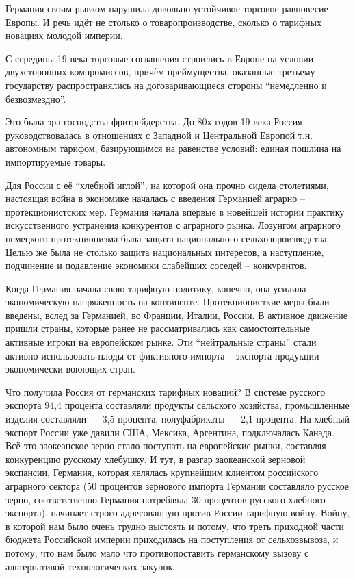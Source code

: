 Германия своим рывком нарушила довольно устойчивое торговое равновесие Европы.
И речь идёт не столько о товаропроизводстве, сколько о тарифных новациях молодой
империи.

С середины 19 века торговые соглашения строились в Европе на условии
двухсторонних компромиссов, причём прей\-мущества, оказанные третьему
государству распространялись на договаривающиеся стороны \enquote{немедленно и
безвозмездно}.

Это была эра господства фритрейдерства. До 80х годов 19 века Россия
руководствовалась в отношениях с Западной и Центральной Европой т.н. автономным
тарифом, базирующимся на равенстве условий: единая пошлина на импортируемые
товары.

Для России с её \enquote{хлебной иглой}, на которой она прочно сидела столетиями,
настоящая война в экономике началась с введения Германией
аграрно -- протекционистских мер. Германия начала впервые в новейшей истории
практику искусственного устранения конкурентов с аграрного рынка. Лозунгом
аграрного немецкого протекционизма была защита национального
сельхозпроизводства. Целью же была не столько защита национальных интересов,
а наступление, подчинение и подавление экономики слабейших соседей -- конкурентов.

Когда Германия начала свою тарифную политику, конечно, она усилила
экономическую напряженность на континенте. Протекционисткие меры были введены,
вслед за Германией, во Франции, Италии, России. В активное движение пришли
страны, которые ранее не рассматривались как самостоятельные активные игроки на
европейском рынке. Эти \enquote{нейтральные страны} стали активно использовать
плоды от фиктивного импорта -- экспорта продукции экономически воюющих стран.

Что получила Россия от германских тарифных новаций? В системе русского экспорта
94,4 процента составляли продукты сельского хозяйства, промышленные изделия
составляли --- 3,5 процента, полуфабрикаты --- 2,1 процента. На хлебный экспорт
России уже давили США, Мексика, Аргентина, подключалась Канада. Всё это
заокеанское зерно стало поступать на европейские рынки, составляя конкуренцию
русскому хлебушку. И тут, в разгар заокеанской зерновой экспансии, Германия,
которая являлась крупнейшим клиентом российского аграрного сектора (50 процентов
зернового импорта Германии составляло русское зерно, соответственно Германия
потребляла 30 процентов русского хлебного экспорта), начинает строго
адресованную против России тарифную войну. Войну, в которой нам было очень
трудно выстоять и потому, что треть приходной части бюджета Российской империи
приходилась на поступления от сельхозвывоза, и потому, что нам было мало что
противопоставить германскому вызову с альтернативой технологических закупок.

